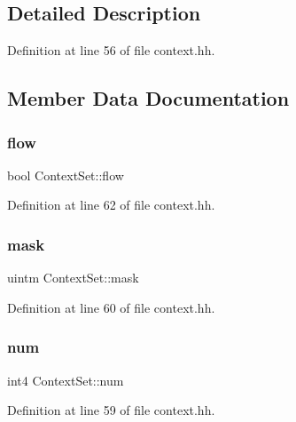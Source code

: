 \subsection{Detailed Description}


Definition at line 56 of file context.\+hh.



\subsection{Member Data Documentation}
\mbox{\label{struct_context_set_a5cc09b961a0da9fa2a9503fb511703b8}} 
\subsubsection{\texorpdfstring{flow}{flow}}
{\footnotesize\ttfamily bool Context\+Set\+::flow}



Definition at line 62 of file context.\+hh.

\mbox{\label{struct_context_set_a6523e5744b2235abf86edf11dd9b5f2f}} 
\subsubsection{\texorpdfstring{mask}{mask}}
{\footnotesize\ttfamily uintm Context\+Set\+::mask}



Definition at line 60 of file context.\+hh.

\mbox{\label{struct_context_set_a126fb90570bd829504d844bd3ff3dd8c}} 
\subsubsection{\texorpdfstring{num}{num}}
{\footnotesize\ttfamily int4 Context\+Set\+::num}



Definition at line 59 of file context.\+hh.

\mbox{\label{struct_context_set_aa594f984cec1f3dbbec00c96fe22a34c}} 
